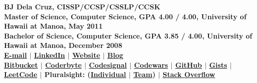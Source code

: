 \documentclass[10pt]{res} %
\newcommand\Address[1]{\tabular{c}#1\endtabular\hfill}
\begin{document}
\begin{center}
\Address{\bf{{\Large BJ Dela Cruz, CISSP/CCSP/CSSLP/CCSK}} \\
{\bf Master of Science}, Computer Science, GPA 4.00 / 4.00, University of Hawaii at Manoa, May 2011 \\
{\bf Bachelor of Science}, Computer Science, GPA 3.85 / 4.00, University of Hawaii at Manoa, December 2008 \\
\href{mailto:bjdelacruz.cissp@gmail.com}{\color{blue}E-mail} $|$ \href{https://www.linkedin.com/in/bj-delacruz}{\color{blue}LinkedIn} $|$ \href{https://bjdelacruz.dev}{\color{blue}Website} $|$ \href{https://javaprogramminglog.blogspot.com}{\color{blue}Blog}} \\
\href{http://www.bitbucket.org/bjpeterdelacruz}{\color{blue}Bitbucket} $|$ \href{https://coderbyte.com/profile/bjpeterdelacruz}{\color{blue}Coderbyte} $|$ \href{https://app.codesignal.com/profile/bjpeter}{\color{blue}Codesignal} $|$ \href{https://www.codewars.com/users/bjpeterdelacruz}{\color{blue}Codewars} $|$ \href{http://www.github.com/bjpeterdelacruz}{\color{blue}GitHub} $|$ \href{http://gist.github.com/bjpeterdelacruz}{\color{blue}Gists} $|$ \href{https://leetcode.com/bjpeterdelacruz}{\color{blue}LeetCode} $|$ Pluralsight: (\href{https://app.pluralsight.com/profile/bjpeter-delacruz-fa}{\color{blue}Individual} $|$ \href{https://app.pluralsight.com/profile/bjpeter-delacruz}{\color{blue}Team}) $|$ \href{http://www.tinyurl.com/so-bpd}{\color{blue}Stack Overflow}
\end{center}

\end{document}
